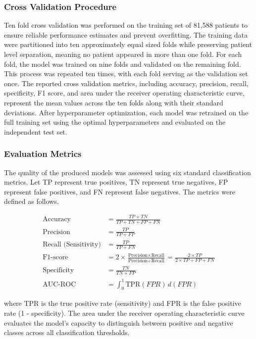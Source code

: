 \documentclass[harvard,article]{frontiersinFPHY_FAMS}
\begin{document}
\subsubsection{Cross Validation Procedure}

Ten fold cross validation was performed on the training set of 81,588 patients to ensure reliable performance estimates and prevent overfitting. The training data were partitioned into ten approximately equal sized folds while preserving patient level separation, meaning no patient appeared in more than one fold. For each fold, the model was trained on nine folds and validated on the remaining fold. This process was repeated ten times, with each fold serving as the validation set once. The reported cross validation metrics, including accuracy, precision, recall, specificity, F1 score, and area under the receiver operating characteristic curve, represent the mean values across the ten folds along with their standard deviations. After hyperparameter optimization, each model was retrained on the full training set using the optimal hyperparameters and evaluated on the independent test set.

\subsubsection{Evaluation Metrics}

The quality of the produced models was assessed using six standard classification metrics. Let TP represent true positives, TN represent true negatives, FP represent false positives, and FN represent false negatives. The metrics were defined as follows.

\begin{align}
\text{Accuracy} &= \frac{TP + TN}{TP + TN + FP + FN} \tag{1} \\
\text{Precision} &= \frac{TP}{TP + FP} \tag{2} \\
\text{Recall (Sensitivity)} &= \frac{TP}{TP + FN} \tag{3} \\
\text{F1-score} &= 2 \times \frac{\text{Precision} \times \text{Recall}}{\text{Precision} + \text{Recall}} = \frac{2 \times TP}{2 \times TP + FP + FN} \tag{4} \\
\text{Specificity} &= \frac{TN}{TN + FP} \tag{5} \\
\text{AUC-ROC} &= \int_{0}^{1} \text{TPR}(FPR) \, d(FPR) \tag{6}
\end{align}

where TPR is the true positive rate (sensitivity) and FPR is the false positive rate (1 - specificity). The area under the receiver operating characteristic curve evaluates the model's capacity to distinguish between positive and negative classes across all classification thresholds.
\end{document}

